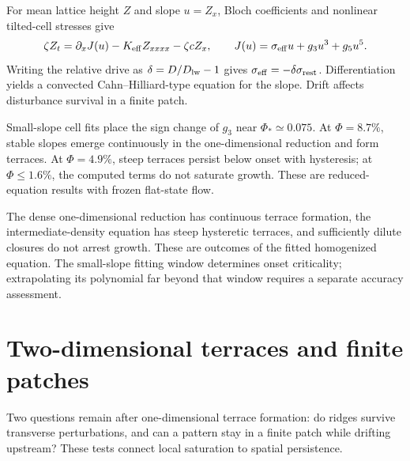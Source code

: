 For mean lattice height $Z$ and slope $u=Z_x$, Bloch coefficients and nonlinear tilted-cell stresses give
\begin{equation}
\zeta Z_t=\partial_xJ(u)-K_{\rm eff}Z_{xxxx}-\zeta cZ_x,\qquad
J(u)=\sigma_{\rm eff}u+g_3u^3+g_5u^5.\label{eq:lattice}
\end{equation}
Writing the relative drive as $\delta=D/D_{\rm lw}-1$ gives $\sigma_{\rm eff}=-\delta\sigma_{\rm rest}$. Differentiation yields a convected Cahn--Hilliard-type equation for the slope. Drift affects disturbance survival in a finite patch.

Small-slope cell fits place the sign change of $g_3$ near $\Phi_*\simeq0.075$. At $\Phi=8.7\%$, stable slopes emerge continuously in the one-dimensional reduction and form terraces. At $\Phi=4.9\%$, steep terraces persist below onset with hysteresis; at $\Phi\leq1.6\%$, the computed terms do not saturate growth. These are reduced-equation results with frozen flat-state flow.






The dense one-dimensional reduction has continuous terrace formation, the intermediate-density equation has steep hysteretic terraces, and sufficiently dilute closures do not arrest growth. These are outcomes of the fitted homogenized equation. The small-slope fitting window determines onset criticality; extrapolating its polynomial far beyond that window requires a separate accuracy assessment.


\section{Two-dimensional terraces and finite patches}\label{sec:terraces2d}
Two questions remain after one-dimensional terrace formation: do ridges survive transverse perturbations, and can a pattern stay in a finite patch while drifting upstream? These tests connect local saturation to spatial persistence.


